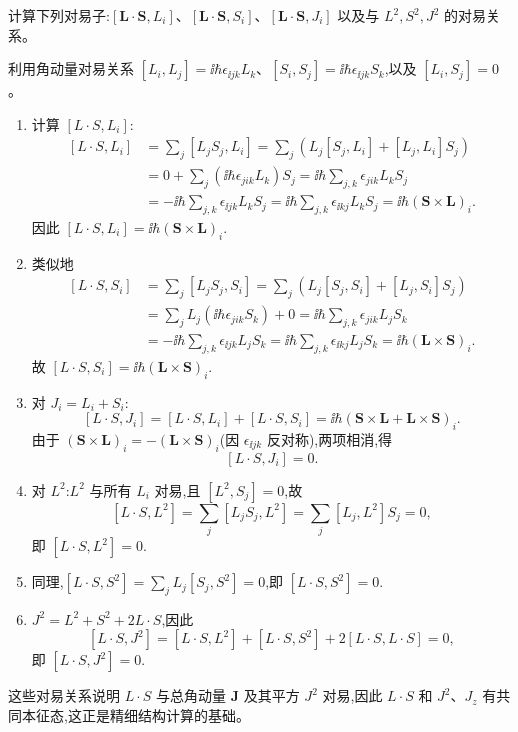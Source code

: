 \begin{question}
计算下列对易子:$[\mathbf L\cdot\mathbf S,L_i]$、$[\mathbf L\cdot\mathbf S,S_i]$、$[\mathbf L\cdot\mathbf S,J_i]$ 以及与 $L^2,S^2,J^2$ 的对易关系。
\begin{solution}
利用角动量对易关系 $[L_i,L_j]=\ii\hbar\epsilon_{\ii jk}L_k$、$[S_i,S_j]=\ii\hbar\epsilon_{\ii jk}S_k$,以及 $[L_i,S_j]=0$。

\begin{enumerate}
\item 计算 $[L\cdot S,L_i]$:
\[
\begin{aligned}
[L\cdot S,L_i]&=\sum_j[L_jS_j,L_i]
=\sum_j\left(L_j[S_j,L_i]+[L_j,L_i]S_j\right) \\
&=0+\sum_j(\ii\hbar\epsilon_{jik}L_k)S_j
=\ii\hbar\sum_{j,k}\epsilon_{jik}L_kS_j \\
&=-\ii\hbar\sum_{j,k}\epsilon_{\ii jk}L_kS_j
=\ii\hbar\sum_{j,k}\epsilon_{\ii kj}L_kS_j
=\ii\hbar(\mathbf S\times\mathbf L)_i.
\end{aligned}
\]
因此 $\boxed{[L\cdot S,L_i]=\ii\hbar(\mathbf S\times\mathbf L)_i.}$

\item 类似地
\[
\begin{aligned}
[L\cdot S,S_i]&=\sum_j[L_jS_j,S_i]
=\sum_j\left(L_j[S_j,S_i]+[L_j,S_i]S_j\right)\\
&=\sum_j L_j(\ii\hbar\epsilon_{jik}S_k)+0
=\ii\hbar\sum_{j,k}\epsilon_{jik}L_jS_k\\
&=-\ii\hbar\sum_{j,k}\epsilon_{\ii jk}L_jS_k
=\ii\hbar\sum_{j,k}\epsilon_{\ii kj}L_jS_k
=\ii\hbar(\mathbf L\times\mathbf S)_i.
\end{aligned}
\]
故 $\boxed{[L\cdot S,S_i]=\ii\hbar(\mathbf L\times\mathbf S)_i.}$

\item 对 $J_i=L_i+S_i$:
\[
[L\cdot S,J_i]=[L\cdot S,L_i]+[L\cdot S,S_i]
=\ii\hbar(\mathbf S\times\mathbf L+\mathbf L\times\mathbf S)_i.
\]
由于 $(\mathbf S\times\mathbf L)_i=-(\mathbf L\times\mathbf S)_i$(因 $\epsilon_{\ii jk}$ 反对称),两项相消,得
\[
\boxed{[L\cdot S,J_i]=0.}
\]

\item 对 $L^2$:$L^2$ 与所有 $L_i$ 对易,且 $[L^2,S_j]=0$,故
\[
[L\cdot S,L^2]=\sum_j[L_jS_j,L^2]=\sum_j[L_j,L^2]S_j=0,
\]
即 $\boxed{[L\cdot S,L^2]=0.}$

\item 同理,$[L\cdot S,S^2]=\sum_j L_j[S_j,S^2]=0$,即 $\boxed{[L\cdot S,S^2]=0.}$

\item $J^2=L^2+S^2+2L\cdot S$,因此
\[
[L\cdot S,J^2]=[L\cdot S,L^2]+[L\cdot S,S^2]+2[L\cdot S,L\cdot S]=0,
\]
即 $\boxed{[L\cdot S,J^2]=0.}$
\end{enumerate}

这些对易关系说明 $L\cdot S$ 与总角动量 $\mathbf J$ 及其平方 $J^2$ 对易,因此 $L\cdot S$ 和 $J^2$、$J_z$ 有共同本征态,这正是精细结构计算的基础。
\end{solution}
\end{question}

